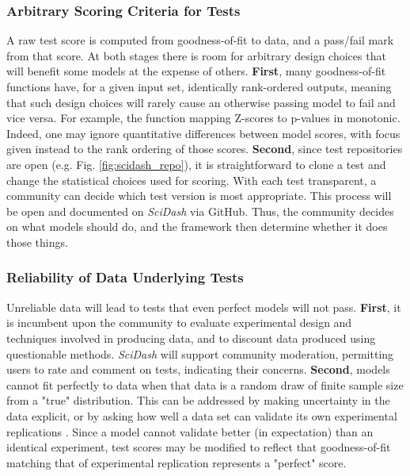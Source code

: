 \documentclass[11pt,letterpaper]{article}
\begin{document}
\subsubsection{Arbitrary Scoring Criteria for Tests}
A raw test score is computed from goodness-of-fit to data, and a pass/fail mark from that score.  At both stages there is room for arbitrary design choices that will benefit some models at the expense of others.  \textbf{First}, many goodness-of-fit functions have, for a given input set, identically rank-ordered outputs, meaning that such design choices will rarely cause an otherwise passing model to fail and vice versa.  For example, the function mapping Z-scores to p-values in monotonic.  Indeed, one may ignore quantitative differences between model scores, with focus given instead to the rank ordering of those scores. \textbf{Second}, since test repositories are open (e.g. Fig. \ref{fig:scidash_repo}), it is straightforward to clone a test and change the statistical choices used for scoring.  With each test transparent, a community can decide which test version is most appropriate.  This process will be open and documented on \textit{SciDash} via GitHub.  Thus, the community decides on what models should do, and the framework then determine whether it does those things. 

\subsubsection{Reliability of Data Underlying Tests}
Unreliable data will lead to tests that even perfect models will not pass. \textbf{First}, it is incumbent upon the community to evaluate experimental design and techniques involved in producing data, and to discount data produced using questionable methods.  \textit{SciDash} will support community moderation, permitting users to rate and comment on tests, indicating their concerns.  \textbf{Second}, models cannot fit perfectly to data when that data is a random draw of finite sample size from a "true" distribution.  This can be addressed by making uncertainty in the data explicit, or by asking how well a data set can validate its own experimental replications \cite{kriegeskorte_representational_2008}.  Since a model cannot validate better (in expectation) than an identical experiment, test scores may be modified to reflect that goodness-of-fit matching that of experimental replication represents a "perfect" score.  
\end{document}
